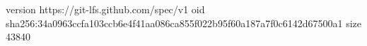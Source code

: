 version https://git-lfs.github.com/spec/v1
oid sha256:34a0963ccfa103ccb6e4f41aa086ca855f022b95f60a187a7f0c6142d67500a1
size 43840
